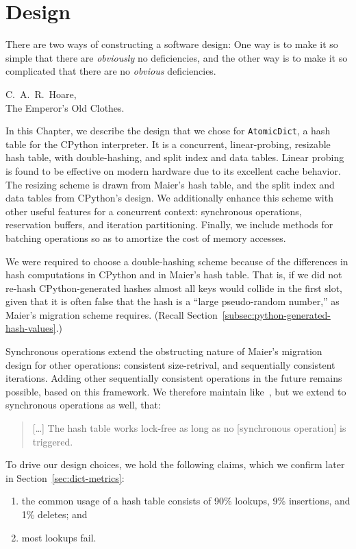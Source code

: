 \chapter{Design}\label{ch:design}


\epigraph{
    There are two ways of constructing a software design: One way is to make it so simple that there are \emph{obviously} no deficiencies, and the other way is to make it so complicated that there are no \emph{obvious} deficiencies.
}{C.\ A.\ R.\ Hoare,\\The Emperor's Old Clothes.}


In this Chapter, we describe the design that we chose for \texttt{AtomicDict}, a hash table for the CPython interpreter.
It is a concurrent, linear-probing, resizable hash table, with double-hashing, and split index and data tables.
Linear probing is found to be effective on modern hardware due to its excellent cache behavior.
The resizing scheme is drawn from Maier's hash table, and the split index and data tables from CPython's design.
We additionally enhance this scheme with other useful features for a concurrent context: synchronous operations, reservation buffers, and iteration partitioning.
Finally, we include methods for batching operations so as to amortize the cost of memory accesses.

We were required to choose a double-hashing scheme because of the differences in hash computations in CPython and in Maier's hash table.
That is, if we did not re-hash CPython-generated hashes almost all keys would collide in the first slot, given that it is often false that the hash is a ``large pseudo-random number,'' as Maier's migration scheme requires.
(Recall Section~\ref{subsec:python-generated-hash-values}.)

Synchronous operations extend the obstructing nature of Maier's migration design for other operations: consistent size-retrival, and sequentially consistent iterations.
Adding other sequentially consistent operations in the future remains possible, based on this framework.
We therefore maintain like~\cite{maier}, but we extend to synchronous operations as well, that:
\begin{quote}
[\ldots]
    The hash table works lock-free as long as no [synchronous operation] is triggered.
\end{quote}

To drive our design choices, we hold the following claims, which we confirm later in Section~\ref{sec:dict-metrics}:
\begin{enumerate}
    \item the common usage of a hash table consists of 90\% lookups, 9\% insertions, and 1\% deletes; and
    \item most lookups fail.
\end{enumerate}

